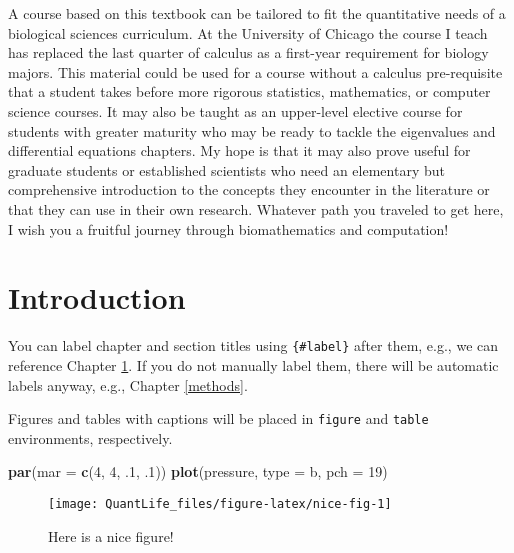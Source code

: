 \documentclass[
]{book}
\newenvironment{Shaded}{\begin{snugshade}}{\end{snugshade}}
\newcommand{\DataTypeTok}[1]{\textcolor[rgb]{0.13,0.29,0.53}{#1}}
\newcommand{\DecValTok}[1]{\textcolor[rgb]{0.00,0.00,0.81}{#1}}
\newcommand{\FloatTok}[1]{\textcolor[rgb]{0.00,0.00,0.81}{#1}}
\newcommand{\KeywordTok}[1]{\textcolor[rgb]{0.13,0.29,0.53}{\textbf{#1}}}
\newcommand{\NormalTok}[1]{#1}
\newcommand{\StringTok}[1]{\textcolor[rgb]{0.31,0.60,0.02}{#1}}
\begin{document}
A course based on this textbook can be tailored to fit the quantitative needs of a biological sciences curriculum. At the University of Chicago the course I teach has replaced the last quarter of calculus as a first-year requirement for biology majors. This material could be used for a course without a calculus pre-requisite that a student takes before more rigorous statistics, mathematics, or computer science courses. It may also be taught as an upper-level elective course for students with greater maturity who may be ready to tackle the eigenvalues and differential equations chapters. My hope is that it may also prove useful for graduate students or established scientists who need an elementary but comprehensive introduction to the concepts they encounter in the literature or that they can use in their own research. Whatever path you traveled to get here, I wish you a fruitful journey through biomathematics and computation!

\hypertarget{intro}{%
\chapter{Introduction}\label{intro}}

You can label chapter and section titles using \texttt{\{\#label\}} after them, e.g., we can reference Chapter \ref{intro}. If you do not manually label them, there will be automatic labels anyway, e.g., Chapter \ref{methods}.

Figures and tables with captions will be placed in \texttt{figure} and \texttt{table} environments, respectively.

\begin{Shaded}
\begin{Highlighting}[]
\KeywordTok{par}\NormalTok{(}\DataTypeTok{mar =} \KeywordTok{c}\NormalTok{(}\DecValTok{4}\NormalTok{, }\DecValTok{4}\NormalTok{, }\FloatTok{.1}\NormalTok{, }\FloatTok{.1}\NormalTok{))}
\KeywordTok{plot}\NormalTok{(pressure, }\DataTypeTok{type =} \StringTok{\textquotesingle{}b\textquotesingle{}}\NormalTok{, }\DataTypeTok{pch =} \DecValTok{19}\NormalTok{)}
\end{Highlighting}
\end{Shaded}

\begin{figure}

{\centering \texttt{[image: QuantLife\_files/figure-latex/nice-fig-1]} 

}

\caption{Here is a nice figure!}\label{fig:nice-fig}
\end{figure}
\end{document}
